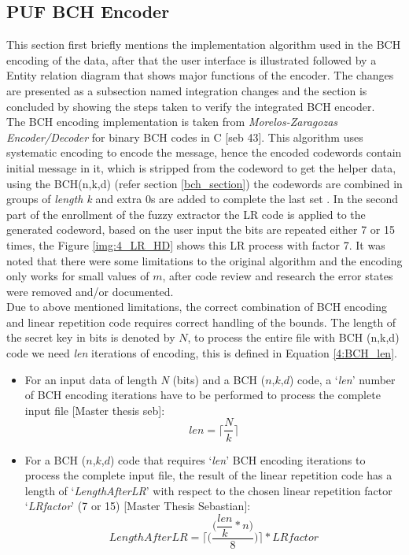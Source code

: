 \subsection{PUF BCH Encoder}
This section first briefly mentions the implementation algorithm used in the BCH encoding of the data, after that the user interface is illustrated followed by a Entity relation diagram that shows major functions of the encoder. The changes are presented as a subsection named integration changes and the section is concluded by showing the steps taken to verify the integrated BCH encoder.\\

The BCH encoding implementation is taken from \emph{Morelos-Zaragozas Encoder/Decoder} for binary BCH codes in C [seb 43]. This algorithm uses systematic encoding to encode the message, hence the encoded codewords contain initial message in it, which is stripped from the codeword to get the helper data, using the BCH(n,k,d) (refer section \ref{bch_section}) the codewords are combined in groups of \emph{length k} and extra 0s are added to complete the last set . In the
second part of the enrollment of the fuzzy extractor the LR code is applied to the generated codeword, based on the user input the bits are repeated either 7 or 15 times, the Figure \ref{img:4_LR_HD} shows this LR process with factor 7. It was noted that there were some limitations to the original algorithm and the encoding only works for small values of $m$, after code review and research the error states were removed and/or documented.\\

	Due to above mentioned limitations, the correct combination of BCH encoding and linear repetition code requires correct handling of the bounds. The length of the secret key in bits is denoted by $N$, to process the entire file with BCH (n,k,d) code we need \emph{len} iterations of encoding, this is defined in Equation \ref{4:BCH_len}.

	\begin{itemize}
		\item For an input data of length \emph{N} (bits) and a BCH ($n$,$k$,$d$) code, a ‘\emph{len}’ number of BCH encoding iterations have to be performed to process the complete input file [Master thesis seb]:
	\begin{equation}
		len =\Bigg\lceil\dfrac{N}{k}\Bigg\rceil
		\label{4:BCH_len}
	\end{equation}

	\item For a BCH ($n$,$k$,$d$) code that requires ‘\emph{len}’ BCH encoding iterations to process the complete input file, the result of the linear repetition code has a length of ‘\emph{LengthAfterLR}’ with respect to the chosen linear repetition factor ‘\emph{LRfactor}’ (7 or 15) [Master Thesis Sebastian]:
	\begin{equation}
		LengthAfterLR = \Bigg\lceil\Bigg(\dfrac{\Bigg(\dfrac{len}{k} * n\Bigg)}{8}\Bigg)\Bigg\rceil * LRfactor
	\label{4:BCH_LR_len}
	\end{equation}
	\end{itemize}

